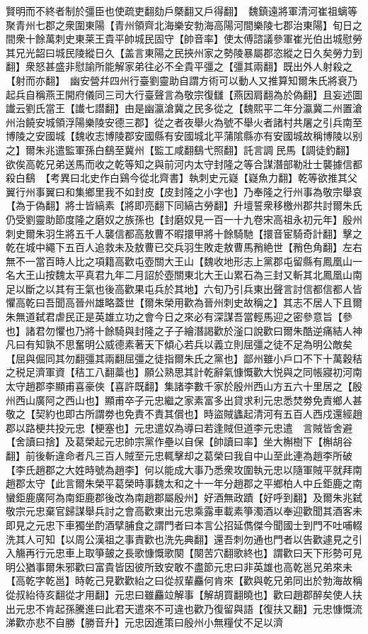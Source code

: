 賢明而不終者制於彊臣也使疏吏翻劾戶槩翻又戶得翻】　魏鎮遠將軍清河崔祖螭等聚青州七郡之衆圍東陽【青州領齊北海樂安勃海高陽河間樂陵七郡治東陽】旬日之間衆十餘萬刺史東莱王貴平帥城民固守【帥音率】使太傅諮議參軍崔光伯出城慰勞其兄光韶曰城民陵縱日久【盖言東陽之民挾州家之勢陵暴屬郡恣縱之日久矣勞力到翻】衆怒甚盛非慰諭所能解家弟往必不全貴平彊之【彊其兩翻】既出外人射殺之【射而亦翻】　幽安營幷四州行臺劉靈助自謂方術可以動人又推算知爾朱氏將衰乃起兵自稱燕王開府儀同三司大行臺聲言為敬宗復讎【燕因肩翻為於偽翻】且妄述圖䜟云劉氏當王【䜟七譛翻】由是幽瀛滄冀之民多從之【魏熙平二年分瀛冀二州置滄州治饒安城領浮陽樂陵安德三郡】從之者夜舉火為號不舉火者諸村共屠之引兵南至博陵之安國城【魏收志博陵郡安國縣有安國城北平蒲隂縣亦有安國城故稱博陵以别之】爾朱兆遣監軍孫白鷂至冀州【監工咸翻鷂弋照翻】託言調民馬【調徒釣翻】欲俟高乾兄弟送馬而收之乾等知之與前河内太守封隆之等合謀潛部勒壯士襲據信都殺白鷂　【考異曰北史作白鷄今從北齊書】執刺史元嶷【嶷魚力翻】乾等欲推其父翼行州事翼曰和集鄉里我不如封皮【皮封隆之小字也】乃奉隆之行州事為敬宗舉哀【為于偽翻】將士皆縞素【將即亮翻下同縞古勞翻】升壇誓衆移檄州郡共討爾朱氏仍受劉靈助節度隆之磨奴之族孫也【封磨奴見一百一十九卷宋高祖永初元年】殷州刺史爾朱羽生將五千人襲信都高敖曹不暇擐甲將十餘騎馳【擐音宦騎奇計翻】擊之乾在城中繩下五百人追救未及敖曹已交兵羽生敗走敖曹馬矟絶世【矟色角翻】左右無不一當百時人比之項籍高歡屯壺關大王山【魏收地形志上黨郡屯留縣有鳳凰山一名大王山按魏太平真君九年二月詔於壺關東北大王山累石為三封又斬其北鳳凰山南足以斷之以其有王氣也後高歡果屯兵於其地】六旬乃引兵東出聲言討信都信都人皆懼高乾曰吾聞高晉州雄略蓋世【爾朱榮用歡為晉州刺史故稱之】其志不居人下且爾朱無道弑君虐民正是英雄立功之會今日之來必有深謀吾當輕馬迎之密參意旨【參也】諸君勿懼也乃將十餘騎與封隆之子子繪潛謁歡於滏口說歡曰爾朱酷逆痛結人神凡曰有知孰不思奮明公威德素著天下傾心若兵以義立則屈彊之徒不足為明公敵矣【屈與倔同其勿翻彊其兩翻屈彊之徒指爾朱氏之黨也】鄙州雖小戶口不下十萬穀秸之税足濟軍資【秸工八翻藁也】願公熟思其計乾辭氣慷慨歡大悦與之同帳寢初河南太守趙郡李顯甫喜豪俠【喜許既翻】集諸李數千家於殷州西山方五六十里居之【殷州西山廣阿之西山也】顯甫卒子元忠繼之家素富多出貸求利元忠悉焚劵免責鄉人甚敬之【契約也即古所謂劵也免責不責其償也】時盜賊蠭起清河有五百人西戍還經趙郡以路梗共投元忠【梗塞也】元忠遣奴為導曰若逢賊但道李元忠遣　言賊皆舍避【舍讀曰捨】及葛榮起元忠帥宗黨作壘以自保【帥讀曰率】坐大槲樹下【槲胡谷翻】前後斬違命者凡三百人賊至元忠輒擊却之葛榮曰我自中山至此連為趙李所破【李氏趙郡之大姓時號為趙李】何以能成大事乃悉衆攻圍執元忠以隨軍賊平就拜南趙郡太守【此言爾朱榮平葛榮時事魏太和之十一年分趙郡之平鄉柏人中丘鉅鹿之南蠻鉅鹿廣阿為南鉅鹿郡後改為南趙郡屬殷州】好酒無政蹟【好呼到翻】及爾朱兆弑敬宗元忠棄官歸謀舉兵討之會高歡東出元忠乘露車載素箏濁酒以奉迎歡聞其酒客未即見之元忠下車獨坐酌酒擘脯食之謂門者曰本言公招延儁傑今聞國士到門不吐哺輟洗其人可知【以周公漢祖之事責歡也洗先典翻】還吾刺勿通也門者以告歡遽見之引入觴再行元忠車上取箏皷之長歌慷慨歌闋【闋苦穴翻歌終也】謂歡曰天下形勢可見明公猶事爾朱邪歡曰富貴皆因彼所致安敢不盡節元忠曰非英雄也高乾邕兄弟來未【高乾字乾邕】時乾己見歡歡紿之曰從叔輩麤何肯來【歡與乾兄弟同出於勃海故稱從叔紿待亥翻從才用翻】元忠曰雖麤竝解事【解胡買翻曉也】歡曰趙郡醉矣使人扶出元忠不肯起孫騰進曰此君天遣來不可違也歡乃復留與語【復扶又翻】元忠慷慨流涕歡亦悲不自勝【勝音升】元忠因進策曰殷州小無糧仗不足以濟